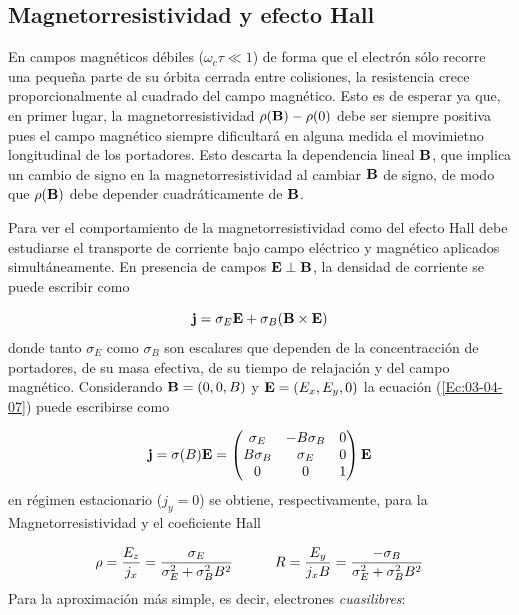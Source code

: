 \subsection{Magnetorresistividad y efecto Hall}

En campos magnéticos débiles ($\omega_c \tau \ll 1$) de forma que el electrón sólo recorre una pequeña parte de su órbita cerrada entre colisiones, la resistencia crece proporcionalmente al cuadrado del campo magnético. Esto es de esperar ya que, en primer lugar, la magnetorresistividad $\rho(\mathbf{B})-\rho(0)$ debe ser siempre positiva pues el campo magnético siempre dificultará en alguna medida el movimietno longitudinal de los portadores. Esto descarta la dependencia lineal $\mathbf{B}$, que implica un cambio de signo en la magnetorresistividad al cambiar $\mathbf{B}$ de signo, de modo que $\rho(\mathbf{B})$ debe depender cuadráticamente de $\mathbf{B}$. 

Para ver el comportamiento de la magnetorresistividad como del efecto Hall debe estudiarse el transporte de corriente bajo campo eléctrico y magnético aplicados simultáneamente. En presencia de campos $\mathbf{E}\perp\mathbf{B}$, la densidad de corriente se puede escribir como 

\begin{equation}
	\mathbf{j} = \sigma_E \mathbf{E} + \sigma_B (\mathbf{B} \times \mathbf{E}) \label{Ec:03-04-07}
\end{equation}
donde tanto $\sigma_E$ como $\sigma_B$ son escalares que dependen de la concentracción de portadores, de su masa efectiva, de su tiempo de relajación y del campo magnético. Considerando $\mathbf{B}=(0,0,B)$ y $\mathbf{E}=(E_x,E_y,0)$ la ecuación (\ref{Ec:03-04-07}) puede escribirse como

\begin{equation}
	\mathbf{j} = \sigma (B) \mathbf{E} = \begin{pmatrix}
	\sigma_E & - B\sigma_B & 0 \\ 
	B \sigma_B & \sigma_E & 0 \\
	0 & 0 & 1 
	\end{pmatrix} \mathbf{E}
\end{equation}
en régimen estacionario ($j_y = 0$) se obtiene, respectivamente, para la Magnetorresistividad y el coeficiente Hall

\begin{equation}
	\rho = \frac{E_z}{j_x} = \frac{\sigma_E}{\sigma_E^2+\sigma_B^2 B^2} \quad \quad \quad R = \frac{E_y}{j_xB} =  \frac{-\sigma_B}{\sigma_E^2 + \sigma_B^2 B^2}
\end{equation}
Para la aproximación más simple, es decir, electrones \textit{cuasilibres}:

